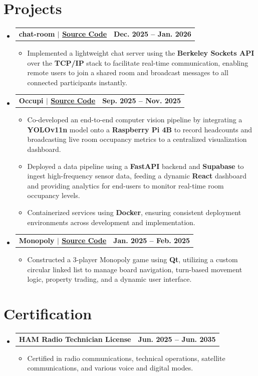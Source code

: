\documentclass[10pt,letterpaper]{article}
\makeatletter
\newcommand{\resumeItem}[1]{\item\small{#1}}
\newcommand{\resumeProjectHeading}[2]{
  \vspace{2pt}\item
    \begin{tabular*}{0.97\textwidth}[t]{l@{\extracolsep{\fill}}r}
      \textbf{#1} & \textbf{\small #2} \\
    \end{tabular*}\vspace{-7pt}
}
\makeatother
\begin{document}
\section{Projects}
\begin{itemize}[leftmargin=0.15in, label={}]
    \resumeProjectHeading
      {chat-room $|$ \normalfont\small\href{https://github.com/ElijahInamarga/chat-room}{Source Code}}{\textbf{Dec. 2025 -- Jan. 2026}}
      \begin{itemize}[leftmargin=0.2in, label=$\bullet$]
        \resumeItem{Implemented a lightweight chat server using the \textbf{Berkeley Sockets API} over the \textbf{TCP/IP} stack to facilitate real-time communication, enabling remote users to join a shared room and broadcast messages to all connected participants instantly.}
      \end{itemize}

    \resumeProjectHeading
      {Occupi $|$ \normalfont\small\href{https://github.com/CarlosG-05/OccupyAI}{Source Code}}{\textbf{Sep. 2025 -- Nov. 2025}}
      \begin{itemize}[leftmargin=0.2in, label=$\bullet$]
        \resumeItem{Co-developed an end-to-end computer vision pipeline by integrating a \textbf{YOLOv11n} model onto a \textbf{Raspberry Pi 4B} to record headcounts and broadcasting live room occupancy metrics to a centralized visualization dashboard.}
        \resumeItem{Deployed a data pipeline using a \textbf{FastAPI} backend and \textbf{Supabase} to ingest high-frequency sensor data, feeding a dynamic \textbf{React} dashboard and providing analytics for end-users to monitor real-time room occupancy levels.}
        \resumeItem{Containerized services using \textbf{Docker}, ensuring consistent deployment environments across development and implementation.}
      \end{itemize}

    \resumeProjectHeading
      {Monopoly $|$ \normalfont\small\href{https://github.com/ElijahInamarga/Monopoly_Game}{Source Code}}{\textbf{Jan. 2025 -- Feb. 2025}}
      \begin{itemize}[leftmargin=0.2in, label=$\bullet$]
        \resumeItem{Constructed a 3-player Monopoly game using \textbf{Qt}, utilizing a custom circular linked list to manage board navigation, turn-based movement logic, property trading, and a dynamic user interface.}
      \end{itemize}
\end{itemize}

\section{Certification}
\begin{itemize}[leftmargin=0.15in, label={}]
    \resumeProjectHeading
      {HAM Radio Technician License}{\textbf{Jun. 2025 -- Jun. 2035}}
      \begin{itemize}[leftmargin=0.2in, label=$\bullet$]
        \resumeItem{Certified in radio communications, technical operations, satellite communications, and various voice and digital modes.}
      \end{itemize}
\end{itemize}
\end{document}
